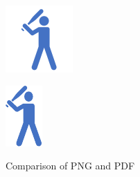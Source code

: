 \begin{figure}[t]
    \centering
  \begin{minipage}{0.3\linewidth}
    \centering
    \includegraphics[clip, trim=0 0 0 0, width=0.9\linewidth]{figures/hit.png}
    \label{fig: png_img}
  \end{minipage}
  \begin{minipage}{0.3\linewidth}
    \centering
    \includegraphics[clip, trim=0 0 0 0, width=0.5\linewidth]{figures/hit_converted.pdf}
    \label{fig: converted_pdf_img}
  \end{minipage}
  \caption{Comparison of PNG and PDF}
  \label{fig: png_vs_pdf}
\end{figure}
